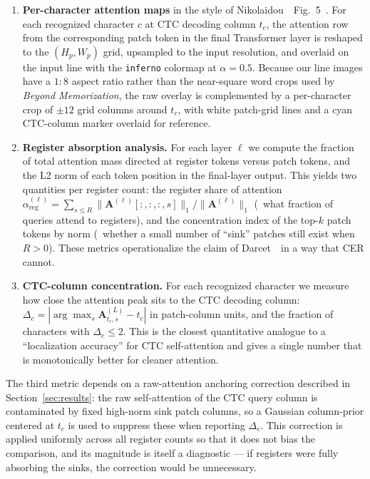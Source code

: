 \begin{enumerate}
    \item \textbf{Per-character attention maps} in the style of Nikolaidou~\etal\ Fig.~5~\cite{nikolaidou2024beyondmem}. For each recognized character $c$ at CTC decoding column $t_c$, the attention row from the corresponding patch token in the final Transformer layer is reshaped to the $(H_p, W_p)$ grid, upsampled to the input resolution, and overlaid on the input line with the \texttt{inferno} colormap at $\alpha = 0.5$. Because our line images have a $1{:}8$ aspect ratio rather than the near-square word crops used by \emph{Beyond Memorization}, the raw overlay is complemented by a per-character crop of $\pm 12$ grid columns around $t_c$, with white patch-grid lines and a cyan CTC-column marker overlaid for reference.
    \item \textbf{Register absorption analysis.} For each layer $\ell$ we compute the fraction of total attention mass directed at register tokens versus patch tokens, and the L2 norm of each token position in the final-layer output. This yields two quantities per register count: the register share of attention $\alpha_{\mathrm{reg}}^{(\ell)} = \sum_{s \leq R} \|\mathbf{A}^{(\ell)}[:,:,:,s]\|_1 / \|\mathbf{A}^{(\ell)}\|_1$ (\ie\ what fraction of queries attend to registers), and the concentration index of the top-$k$ patch tokens by norm (\ie\ whether a small number of ``sink'' patches still exist when $R > 0$). These metrics operationalize the claim of Darcet~\etal\ in a way that CER cannot.
    \item \textbf{CTC-column concentration.} For each recognized character we measure how close the attention peak sits to the CTC decoding column: $\Delta_c = |\arg\max_{s} \mathbf{A}^{(L)}_{t_c, s} - t_c|$ in patch-column units, and the fraction of characters with $\Delta_c \leq 2$. This is the closest quantitative analogue to a ``localization accuracy'' for CTC self-attention and gives a single number that is monotonically better for cleaner attention.
\end{enumerate}

The third metric depends on a raw-attention anchoring correction described in Section~\ref{sec:results}: the raw self-attention of the CTC query column is contaminated by fixed high-norm sink patch columns, so a Gaussian column-prior centered at $t_c$ is used to suppress these when reporting $\Delta_c$. This correction is applied uniformly across all register counts so that it does not bias the comparison, and its magnitude is itself a diagnostic --- if registers were fully absorbing the sinks, the correction would be unnecessary.
